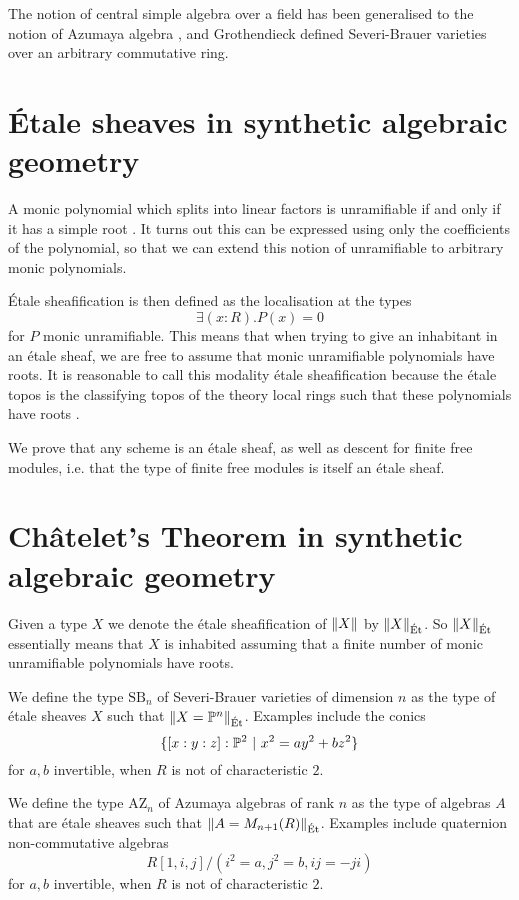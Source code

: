 \documentclass{../util/zariski}
\newcommand{\SB}{\mathrm{SB}}
\newcommand{\AZ}{\mathrm{AZ}}
\newcommand{\propTruncEt}[1]{\propTrunc{#1}_{\mathrm{\acute{E}t}}}
\begin{document}
The notion of central simple algebra over a field
has been generalised to the notion of Azumaya algebra  \cite{azumaya51}, and
Grothendieck \cite{grothendieck68} defined Severi-Brauer varieties over an arbitrary commutative ring.


\section{Étale sheaves in synthetic algebraic geometry}

A monic polynomial which splits into linear factors is unramifiable if and only if it has a simple root \cite{wraith79}. It turns out this can be expressed using only the coefficients of the polynomial, so that we can extend this notion of unramifiable to arbitrary monic polynomials.

Étale sheafification is then defined as the localisation \cite{modalities} at the types
\[\exists (x:R).P(x)=0\] 
for $P$ monic unramifiable. This means that when trying to give an inhabitant in an étale sheaf, we are free to assume that monic unramifiable polynomials have roots. It is reasonable to call this modality étale sheafification because the étale topos is the classifying topos of the theory local rings such that these polynomials have roots \cite{wraith79}.

We prove that any scheme is an étale sheaf, as well as descent for finite free modules, i.e. that the type of finite free modules is itself an étale sheaf.


\section{Ch\^atelet's Theorem in synthetic algebraic geometry}

Given a type $X$ we denote the étale sheafification of $\lVert X \rVert$ by $\propTruncEt{X}$. So $\propTruncEt{X}$ essentially means that $X$ is inhabited assuming that a finite number of monic unramifiable polynomials have roots.

We define the type $\SB_n$ of Severi-Brauer varieties of dimension $n$ as the type of étale sheaves $X$ such that $\lVert X=\mathbb{P}^n \rVert_{\mathrm{\acute{E}t}}$. Examples include the conics
\[\{[x:y:z]:\mathbb{P}^2\ |\ x^2 = ay^2+bz^2\}\]
for $a,b$ invertible, when $R$ is not of characteristic $2$.

We define the type $\AZ_n$ of Azumaya algebras of rank $n$ as the type of algebras $A$ that are étale sheaves such that $\lVert A=M_{n+1}(R) \rVert_{\mathrm{\acute{E}t}}$. Examples include quaternion non-commutative algebras
\[R[1,i,j]/(i^2=a,j^2=b,ij=-ji)\]
for $a,b$ invertible, when $R$ is not of characteristic $2$.
\end{document}

